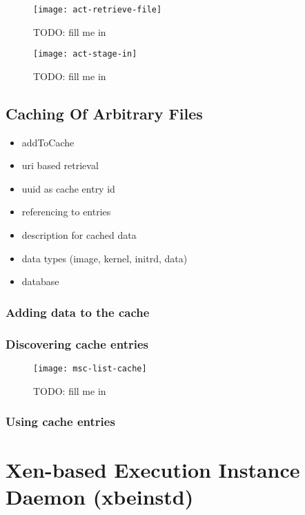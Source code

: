 \begin{figure}[ht]
  \centering
  \texttt{[image: act-retrieve-file]}
  \caption[File Retrieval Activity]{TODO: fill me in}
  \label{fig:act-retrieve-file}
\end{figure}


\begin{figure}[ht]
  \texttt{[image: act-stage-in]}
  \caption[Stage-In Activity]{TODO: fill me in}
  \label{fig:act-stage-in}
\end{figure}


\subsection{Caching Of Arbitrary Files}
\label{sec:caching}

\begin{itemize}
\item addToCache
\item uri based retrieval
\item uuid as cache entry id
\item referencing to entries
\item description for cached data
\item data types (image, kernel, initrd, data)
\item database
\end{itemize}

\subsubsection{Adding data to the cache}

\subsubsection{Discovering cache entries}

\begin{figure}[ht]
  \centering
  \texttt{[image: msc-list-cache]}
  \caption[MSC List Cache Entries]{TODO: fill me in}
  \label{fig:msc-list-cache}
\end{figure}

\subsubsection{Using cache entries}

\section[Xen-based Execution Instance Daemon]{Xen-based Execution Instance Daemon (xbeinstd)}
\label{sec:xbeinstd}

